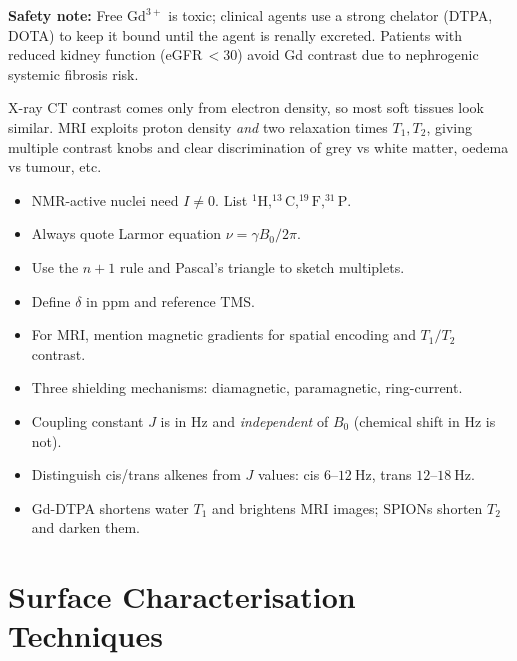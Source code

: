 \documentclass[12pt,a4paper]{article}
\begin{document}
\textbf{Safety note:} Free $\mathrm{Gd^{3+}}$ is toxic; clinical agents use a strong chelator (DTPA, DOTA) to keep it bound until the agent is renally excreted. Patients with reduced kidney function (eGFR\,$<30$) avoid Gd contrast due to nephrogenic systemic fibrosis risk.

\begin{tcolorbox}[masonbox, title={Why MRI Has Better Soft-Tissue Contrast than X-ray CT}]
X-ray CT contrast comes only from electron density, so most soft tissues look similar. MRI exploits proton density \emph{and} two relaxation times $T_1, T_2$, giving multiple contrast knobs and clear discrimination of grey vs white matter, oedema vs tumour, etc.
\end{tcolorbox}

\begin{tcolorbox}[exambox, title={Exam Points (Section 5)}]
\begin{itemize}[leftmargin=*, itemsep=2pt, topsep=2pt]
  \item NMR-active nuclei need $I\neq 0$. List $^{1}\mathrm{H}, ^{13}\mathrm{C}, ^{19}\mathrm{F}, ^{31}\mathrm{P}$.
  \item Always quote Larmor equation $\nu=\gamma B_0/2\pi$.
  \item Use the $n+1$ rule and Pascal's triangle to sketch multiplets.
  \item Define $\delta$ in ppm and reference TMS.
  \item For MRI, mention magnetic gradients for spatial encoding and $T_1/T_2$ contrast.
  \item Three shielding mechanisms: diamagnetic, paramagnetic, ring-current.
  \item Coupling constant $J$ is in Hz and \emph{independent} of $B_0$ (chemical shift in Hz is not).
  \item Distinguish cis/trans alkenes from $J$ values: cis $6$--$12\ \mathrm{Hz}$, trans $12$--$18\ \mathrm{Hz}$.
  \item Gd-DTPA shortens water $T_1$ and brightens MRI images; SPIONs shorten $T_2$ and darken them.
\end{itemize}
\end{tcolorbox}

\section{Surface Characterisation Techniques}
\end{document}
